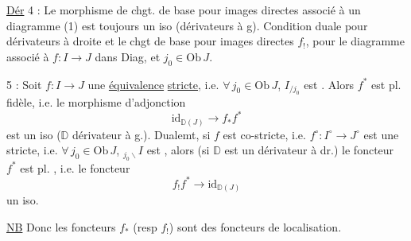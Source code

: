 \uline{Dér} 4 : Le morphisme de chgt. de base pour images directes  associé à un diagramme (1) est toujours un iso (dérivateurs à g). Condition duale pour dérivateurs à droite et le chgt de base pour images directes $f_!$, pour le diagramme
associé à $f:I\to J$ dans Diag, et $j_0\in\mathrm{Ob}\,J$.

 5 : Soit $f:I\to J$ une \uline{équivalence} \uline{stricte}, i.e. $\forall\,j_0\in\mathrm{Ob}\,J$, $I_{/j_0}$ est . Alors $f^*$ est pl. fidèle, i.e. le morphisme d'adjonction
\[
 \mathrm{id}_{\mathbb D(J)}\longrightarrow f_*f^*
\]
est un iso ($\mathbb D$ dérivateur à g.). Dualemt, si $f$ est   co-stricte, i.e. $f^\circ:I^\circ\to J^\circ$ est une  stricte, i.e. $\forall\,j_0\in\mathrm{Ob}\,J$, ${}_{j_0\backslash}I$ est , alors (si $\mathbb D$ est un dérivateur à dr.) le foncteur $f^*$ est pl. , i.e. le foncteur
\[
 f_!f^*\longrightarrow\mathrm{id}_{\mathbb D(J)}
\]
  un iso.

\uline{NB} Donc les foncteurs $f_*$ (resp $f_!$) sont des foncteurs de localisation.

